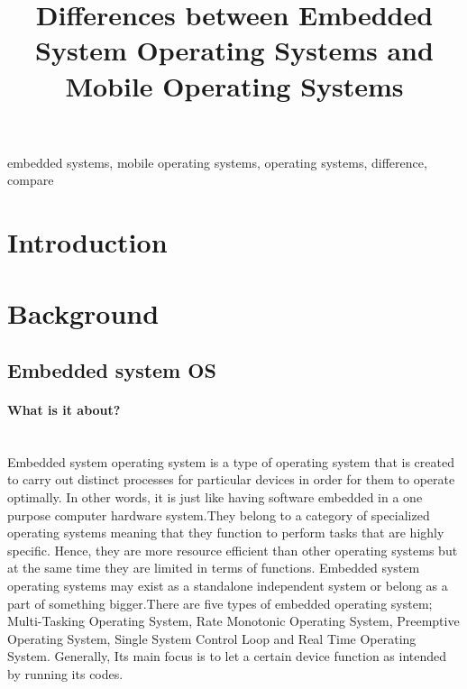 \documentclass[conference]{IEEEtran}
\begin{document}
\title{Differences between Embedded System Operating Systems and Mobile Operating Systems\\
}



\maketitle

\begin{abstract}
\end{abstract}

\begin{IEEEkeywords}
embedded systems, mobile operating systems, operating systems, difference, compare
\end{IEEEkeywords}

\section{Introduction}

\section{Background}
\subsection{Embedded system OS}

\paragraph{What is it about?}\mbox{} \\
Embedded system operating system is a type of operating system that is created to carry out distinct processes for particular devices in order for them to operate optimally. In other words, it is just like having software embedded in a one purpose computer hardware system.They belong to a category of specialized operating systems meaning that they function to perform tasks that are highly specific. Hence, they are more resource efficient than other operating systems but at the same time they are limited in terms of functions. Embedded system operating systems may exist as a standalone independent system or belong as a part of something bigger.There are five types of embedded operating system; Multi-Tasking Operating System, Rate Monotonic Operating System, Preemptive Operating System, Single System Control Loop and Real Time Operating System. Generally, Its main focus is to let a certain device function as intended by running its codes.\\
\end{document}
